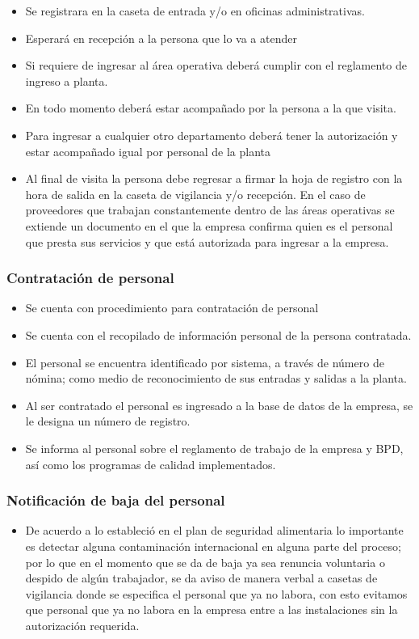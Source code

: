 \begin{itemize}
	\item Se registrara en la caseta de entrada y/o en oficinas administrativas.
	\item Esperará en recepción a la persona que lo va a atender
	\item Si requiere de ingresar al área operativa deberá cumplir con el reglamento de ingreso a planta.
	\item En todo momento deberá estar acompañado por la persona a la que visita.
	\item Para ingresar a cualquier otro departamento deberá tener la autorización y estar acompañado igual por personal de la planta
	\item Al final de visita la persona debe regresar a firmar la hoja de registro con la hora de salida en la caseta de vigilancia y/o recepción.
En el caso de proveedores que trabajan constantemente dentro de las áreas operativas se extiende un documento en el que la empresa confirma quien es el personal que presta sus servicios y que está autorizada para ingresar a la empresa.
\end{itemize}

\subsubsection{Contratación de personal}
\begin{itemize}
	\item Se cuenta con procedimiento para contratación de personal
	\item Se cuenta con el recopilado de información personal de la persona contratada.
	\item El personal se encuentra identificado por sistema, a través de número de nómina; como medio de reconocimiento de sus entradas y salidas a la planta.
	\item Al ser contratado el personal es ingresado a la base de datos de la empresa, se le designa un número de registro.
	\item Se informa al personal sobre el reglamento de trabajo de la empresa y BPD, así como los programas de calidad implementados.
\end{itemize}

\subsubsection{Notificación de baja del personal}
\begin{itemize}
	\item De acuerdo a lo estableció en el plan de seguridad alimentaria lo importante es detectar alguna contaminación internacional en alguna parte del proceso; por lo que en el momento que se da de baja ya sea renuncia voluntaria o despido de algún trabajador, se da aviso de manera verbal a casetas de vigilancia donde se especifica el personal que ya no labora, con esto evitamos que personal que ya no labora en la empresa entre a las instalaciones sin la autorización requerida.
\end{itemize}

